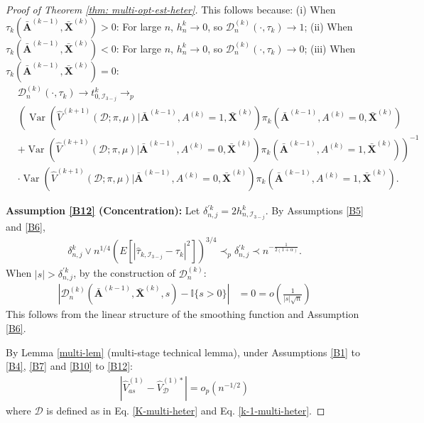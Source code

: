 \documentclass[11pt]{article}
\theoremstyle{referenceplain}
\theoremstyle{referencedefinition}
\theoremstyle{referenceremark}
\begin{document}
\begin{proof}[Proof of Theorem \ref{thm: multi-opt-est-heter}]
This follows because:
(i) When $\tau_k(\bar{\mathbf{A}}^{(k-1)},\bar{\mathbf{X}}^{(k)}) > 0$: For large $n$, $h_n^k \to 0$, so {$\mathcal{D}_n^{(k)}(\cdot,\tau_k) \to 1$};
(ii) When $\tau_k(\bar{\mathbf{A}}^{(k-1)},\bar{\mathbf{X}}^{(k)}) < 0$: For large $n$, $h_n^k \to 0$, so {$\mathcal{D}_n^{(k)}(\cdot,\tau_k) \to 0$};  
(iii) When $\tau_k(\bar{\mathbf{A}}^{(k-1)},\bar{\mathbf{X}}^{(k)}) = 0$:
\begin{align*}
   & {\mathcal{D}_n^{(k)}(\cdot,\tau_k)} \to t_{0,\mathcal{I}_{3-j}}^k\to_p\\
     &\left(\operatorname{Var}(\widehat{V}^{(k+1)}(\mathcal{D};\pi,\mu)|\bar{\mathbf{A}}^{(k-1)},A^{(k)}=1,\bar{\mathbf{X}}^{(k)})\pi_k(\bar{\mathbf{A}}^{(k-1)},A^{(k)}=0,\bar{\mathbf{X}}^{(k)})\right.\\
   &+\left.\operatorname{Var}(\widehat{V}^{(k+1)}(\mathcal{D};\pi,\mu)|\bar{\mathbf{A}}^{(k-1)},A^{(k)}=0,\bar{\mathbf{X}}^{(k)})\pi_k(\bar{\mathbf{A}}^{(k-1)},A^{(k)}=1,\bar{\mathbf{X}}^{(k)})\right)^{-1}\\
   &\cdot \operatorname{Var}(\widehat{V}^{(k+1)}(\mathcal{D};\pi,\mu)|\bar{\mathbf{A}}^{(k-1)},A^{(k)}=0,\bar{\mathbf{X}}^{(k)})\pi_k(\bar{\mathbf{A}}^{(k-1)},A^{(k)}=1,\bar{\mathbf{X}}^{(k)}).
\end{align*}

\textbf{Assumption \ref{B12} (Concentration):}
Let ${\delta_{n,j}^{\prime k}} = 2h_{n,\mathcal{I}_{3-j}}^k$. {By Assumptions \ref{B5} and \ref{B6},
\begin{align*}
\delta_{n,j}^k\lor n^{1/4}\left(E[|\widehat\tau_{k,\mathcal I_{3-j}}-\tau_k|^2]\right)^{3/4}
\prec_p\delta_{n,j}^{\prime k}\prec n^{-\frac{1}{2(1+\alpha)}}.
\end{align*}}
When $|s| > {\delta_{n,j}^{\prime k}}$, by the construction of {$\mathcal{D}_n^{(k)}$}:
\begin{align}
    |{\mathcal{D}_n^{(k)}}(\bar{\mathbf{A}}^{(k-1)},\bar{\mathbf{X}}^{(k)},s) - {\mathbb{I}\{s>0\}}| &{=0}= o\left(\frac{1}{|s|\sqrt{n}}\right)
\end{align}
This follows from the linear structure of the smoothing function and Assumption \ref{B6}.


By Lemma \ref{multi-lem} (multi-stage technical lemma), under Assumptions \ref{B1} to \ref{B4}, \ref{B7} and \ref{B10} to \ref{B12}:
\begin{align}
    \left|\widehat{V}_{as}^{(1)} - \widehat{V}_{\mathcal{D}}^{(1)*}\right| = o_p(n^{-1/2})
\end{align}
where $\mathcal{D}$ is defined as in Eq. \eqref{K-multi-heter} and  Eq. \eqref{k-1-multi-heter}.
\end{proof}
\end{document}
